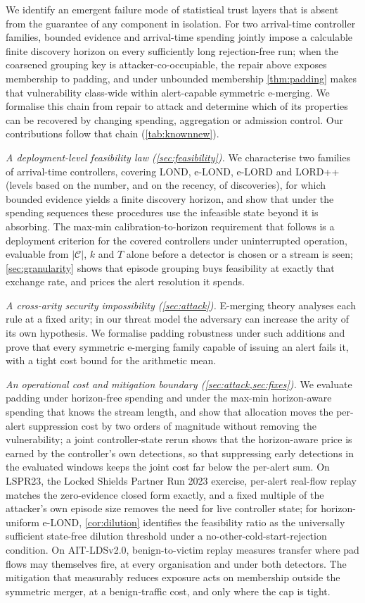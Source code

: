 \documentclass[conference]{IEEEtran}
\newcommand{\Cal}{\mathcal{C}}
\newcommand{\nCal}{\lvert\Cal\rvert}
\begin{document}
We identify an emergent failure mode of statistical trust layers that is absent from the guarantee of
any component in isolation. For two arrival-time controller families, bounded evidence and
arrival-time spending jointly impose a calculable finite discovery horizon on every sufficiently long
rejection-free run; when the coarsened grouping key is attacker-co-occupiable, the repair above
exposes membership to padding, and under unbounded membership
\cref{thm:padding} makes that vulnerability class-wide within alert-capable symmetric e-merging. We
formalise this chain from repair to attack and determine which of its properties can be recovered by
changing spending, aggregation or admission control. Our contributions follow that chain
(\cref{tab:knownnew}).

\emph{A deployment-level feasibility law (\cref{sec:feasibility}).} We characterise two families of
arrival-time controllers, covering LOND, e-LOND, e-LORD and LORD++ (levels based on the number, and on
the recency, of discoveries), for which bounded evidence yields a
finite discovery horizon, and show that under the spending sequences these procedures use the
infeasible state beyond it is absorbing. The max-min calibration-to-horizon requirement that follows is
a deployment criterion for the covered controllers under uninterrupted operation, evaluable from
$\nCal$, $k$ and $T$ alone before a detector is chosen or a stream is seen; \cref{sec:granularity} shows that episode grouping buys feasibility at exactly that
exchange rate, and prices the alert resolution it spends.

\emph{A cross-arity security impossibility (\cref{sec:attack}).} E-merging theory analyses each rule at a
fixed arity; in our threat model the adversary can increase the arity of its own hypothesis. We
formalise padding robustness under such additions and prove that every symmetric e-merging family
capable of issuing an alert fails it, with a tight cost bound for the arithmetic mean.

\emph{An operational cost and mitigation boundary (\cref{sec:attack,sec:fixes}).} We evaluate
padding under horizon-free spending and under the max-min horizon-aware spending that knows the
stream length, and show that allocation moves the
per-alert suppression cost by two orders of magnitude without removing the vulnerability; a joint
controller-state rerun shows that the horizon-aware price is earned by the controller's own
detections, so that suppressing early detections in the evaluated windows keeps the joint cost far
below the per-alert sum. On LSPR23, the Locked Shields Partner Run 2023 exercise, per-alert real-flow
replay matches the zero-evidence closed form exactly, and a fixed multiple of the attacker's own
episode size removes the need for live controller state; for horizon-uniform e-LOND,
\cref{cor:dilution} identifies the feasibility ratio as the universally sufficient state-free dilution
threshold under a no-other-cold-start-rejection condition. On AIT-LDSv2.0, benign-to-victim replay
measures transfer where pad flows may themselves fire, at every organisation and under both detectors.
The mitigation that measurably reduces exposure acts on membership outside the symmetric merger, at a
benign-traffic cost, and only where the cap is tight.
\end{document}
